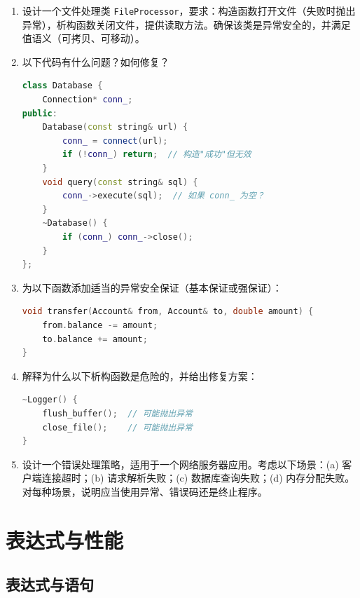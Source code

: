 \begin{enumerate}
\item 设计一个文件处理类 \texttt{FileProcessor}，要求：构造函数打开文件（失败时抛出异常），析构函数关闭文件，提供读取方法。确保该类是异常安全的，并满足值语义（可拷贝、可移动）。

\item 以下代码有什么问题？如何修复？
\begin{lstlisting}[language=C++]
class Database {
    Connection* conn_;
public:
    Database(const string& url) {
        conn_ = connect(url);
        if (!conn_) return;  // 构造"成功"但无效
    }
    void query(const string& sql) {
        conn_->execute(sql);  // 如果 conn_ 为空？
    }
    ~Database() {
        if (conn_) conn_->close();
    }
};
\end{lstlisting}

\item 为以下函数添加适当的异常安全保证（基本保证或强保证）：
\begin{lstlisting}[language=C++]
void transfer(Account& from, Account& to, double amount) {
    from.balance -= amount;
    to.balance += amount;
}
\end{lstlisting}

\item 解释为什么以下析构函数是危险的，并给出修复方案：
\begin{lstlisting}[language=C++]
~Logger() {
    flush_buffer();  // 可能抛出异常
    close_file();    // 可能抛出异常
}
\end{lstlisting}

\item 设计一个错误处理策略，适用于一个网络服务器应用。考虑以下场景：(a) 客户端连接超时；(b) 请求解析失败；(c) 数据库查询失败；(d) 内存分配失败。对每种场景，说明应当使用异常、错误码还是终止程序。
\end{enumerate}


\part{表达式与性能}


\chapter{表达式与语句}

